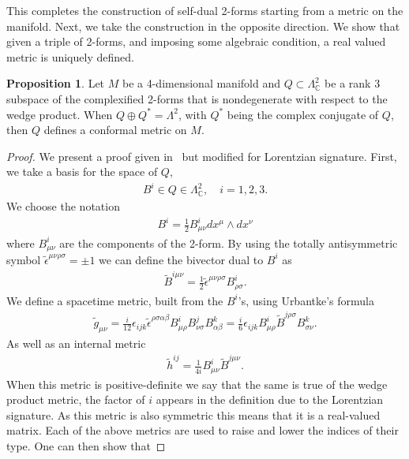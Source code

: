 \documentclass[10pt]{report}
\newcommand{\urb}[0]{Urbantke}
\theoremstyle{definition}
\newtheorem{proposition}{Proposition}[chapter]
\newcommand{\C}[0]{\mathbb{C}}
\newcommand{\teps}[0]{\tilde{\epsilon}}
\begin{document}
This completes the construction of self-dual 2-forms starting from a metric on the manifold. Next, we take the construction in the opposite direction. We show that given a triple of 2-forms, and imposing some algebraic condition, a real valued metric is uniquely defined.
\begin{proposition}\label{prop:pleb-trip-B-defines-metric-proof}
    Let $M$ be a 4-dimensional manifold and $Q \subset \Lambda^2_\C$ be a rank 3 subspace of the complexified 2-forms that is nondegenerate with respect to the wedge product. When $Q \oplus Q^* = \Lambda^2$, with $Q^*$ being the complex conjugate of $Q$, then $Q$ defines a conformal metric on $M$.
\end{proposition}
\begin{proof}
    We present a proof given in~\cite{ModifiedGravitFreide2008} but modified for Lorentzian signature. First, we take a basis for the space of $Q$, 
    \begin{align}
        B^i \in Q \in \Lambda^2_\C, \quad i = 1,2,3.
    \end{align}
    We choose the notation 
    \begin{align}
        B^i = \frac{1}{2} B^i_{\mu\nu} dx^\mu \wedge dx^\nu
    \end{align}
    where $B^i_{\mu\nu}$ are the components of the 2-form. By using the totally antisymmetric symbol $\teps^{\mu\nu\rho\sigma} = \pm 1$ we can define the bivector dual to $B^i$ as 
    \begin{align}
        \tilde{B}^{i\mu\nu} = \frac{1}{2} \teps^{\mu\nu\rho\sigma} B^i_{\rho\sigma}.
    \end{align}
    We define a spacetime metric, built from the $B^i$'s, using \urb{}'s formula~\cite{OnIntegrabilitUrbant1984} 
    \begin{align}
        \tilde{g}_{\mu\nu} = \frac{i}{12} \epsilon_{ijk} \teps^{\rho\sigma\alpha\beta} B^i_{\mu\rho} B^j_{\nu\sigma} B^k_{\alpha\beta} = \frac{i}{6} \epsilon_{ijk} B^i_{\mu\rho} \tilde{B}^{j\rho\sigma} B^k_{\sigma\nu}. \label{eq:pleb-urbantke-BBB-formula}
    \end{align}
    As well as an internal metric
    \begin{align}
        \tilde{h}^{ij} = \frac{1}{4i} B^i_{\mu\nu}  \tilde{B}^{j\mu\nu}. \label{eq:pleb-internal-metric-BB}
    \end{align}
    When this metric is positive-definite we say that the same is true of the wedge product metric, the factor of $i$ appears in the definition due to the Lorentzian signature. As this metric is also symmetric this means that it is a real-valued matrix. Each of the above metrics are used to raise and lower the indices of their type. One can then show that 

\end{proof}
\end{document}
